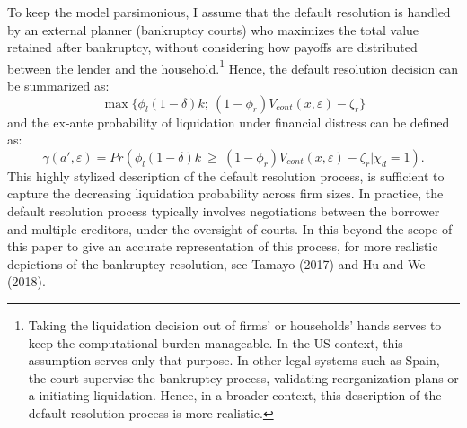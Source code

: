 \documentclass[12pt]{article}
\begin{document}
To keep the model parsimonious, I assume that the default resolution is handled by an external planner (bankruptcy courts) who maximizes the total value retained after bankruptcy, without considering how payoffs are distributed between the lender and the household.\footnote{Taking the liquidation decision out of firms' or households' hands serves to keep the computational burden manageable. In the US context, this assumption serves only that purpose. In other legal systems such as Spain, the court supervise the bankruptcy process, validating reorganization plans or a initiating liquidation. Hence, in a broader context, this description of the default resolution process is more realistic.} Hence, the default resolution decision can be summarized as: 
\begin{equation} \label{eq:liquidation decision}
 \max \{ \phi_l (1-\delta) k; \ (1-\phi_r) V_{cont}(x,\varepsilon)- \zeta_r\}
\end{equation}
and the ex-ante probability of liquidation under financial distress can be defined as: 
\begin{equation} \label{eq:liquidation probability}
    \gamma(a', \varepsilon) = Pr(\phi_l (1-\delta) k \ \geq \ (1-\phi_r) V_{cont}(x,\varepsilon) - \zeta_r | \chi_d = 1).
\end{equation} 
This highly stylized description of the default resolution process, is sufficient to capture the decreasing liquidation probability across firm sizes. In practice, the default resolution process typically involves negotiations between the borrower and multiple creditors, under the oversight of courts. In this beyond the scope of this paper to give an accurate representation of this process, for more realistic depictions of the bankruptcy resolution, see Tamayo (2017) and Hu and We (2018).
\end{document}
